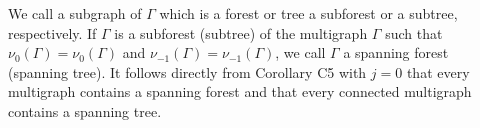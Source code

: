 We call a subgraph of $\Gamma$ which is a forest or tree a subforest or a subtree, respectively. If $\Gamma$ is a subforest (subtree) of the multigraph $\Gamma$ such that $\nu_0(\Gamma) = \nu_0(\Gamma)$ and $\nu_{-1}(\Gamma) = \nu_{-1}(\Gamma)$, we call $\Gamma$ a spanning forest (spanning tree). It follows directly from Corollary C5 with $j = 0$ that every multigraph contains a spanning forest and that every connected multigraph contains a spanning tree.
